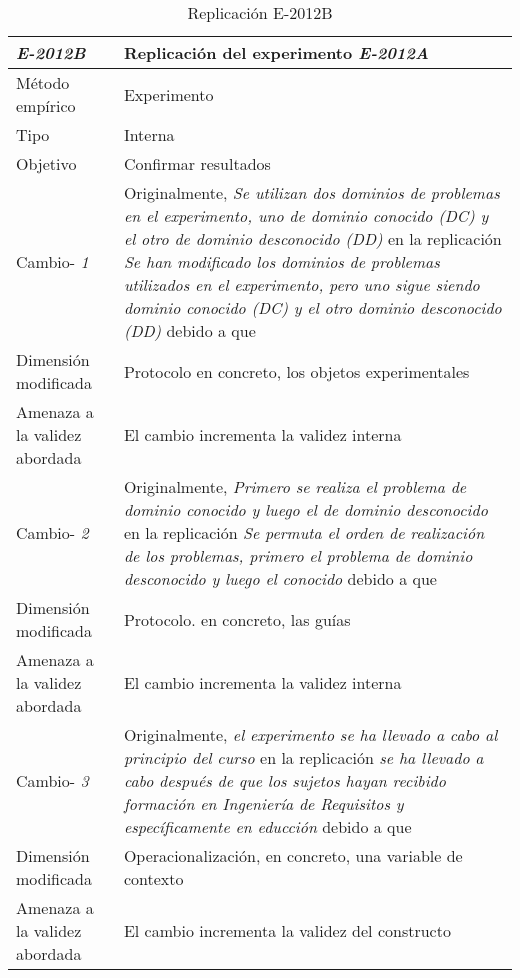 
\begin{table}
\caption{Replicación E-2012B}
\begin{tabular}{| p{3.3cm} | p{9cm} |}
\hline

\textbf {\textit{E-2012B}} & Replicación del experimento \textit{E-2012A }    \\  \hline

Método empírico &  Experimento   \\  \hline
Tipo &  Interna   \\  \hline
Objetivo  &  Confirmar resultados  \\  \hline \hline

Cambio- \textit{1}   & \parbox[t]{9cm} {Originalmente,  \textit{Se utilizan dos dominios de problemas en el experimento, uno de dominio conocido (DC) y el otro de dominio desconocido (DD)} } \parbox[t]{9cm}{en la replicación \textit{ Se han modificado los dominios de problemas utilizados en el experimento, pero uno sigue siendo dominio conocido (DC) y el otro dominio desconocido (DD)} }  debido a que \textit{ } \\  \hline
Dimensión modificada & 
 Protocolo en concreto, los objetos experimentales  \\  \hline 
Amenaza a la validez abordada  & El cambio incrementa la validez interna  \\  \hline
 \hline
 
Cambio- \textit{2}   & \parbox[t]{9cm} {Originalmente,  \textit{Primero se realiza el problema de dominio conocido y luego el de dominio desconocido  } } \parbox[t]{9cm}{en la replicación \textit{ Se permuta el orden de realización de los problemas, primero el problema de dominio desconocido y luego el conocido} }  debido a que \textit{ } \\  \hline
Dimensión modificada & 
 Protocolo. en concreto, las guías  \\  \hline 
Amenaza a la validez abordada  & El cambio incrementa la validez interna  \\  \hline
 \hline
 
Cambio- \textit{3}   & \parbox[t]{9cm} {Originalmente,  \textit{el experimento se ha llevado a cabo al principio del curso  } } \parbox[t]{9cm}{en la replicación \textit{se ha llevado a cabo después de que los sujetos hayan recibido formación en Ingeniería de Requisitos y específicamente en educción} }  debido a que \textit{ } \\  \hline
Dimensión modificada & 
Operacionalización, en concreto, una variable de contexto  \\  \hline 
Amenaza a la validez abordada  & El cambio incrementa la validez del constructo  \\  \hline
 \hline



\end{tabular}
\end{table}
